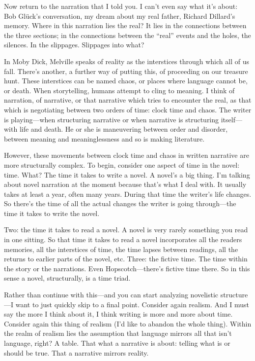 \documentclass[
]{memoir}
\begin{document}
Now return to the narration that I told you. I can't even say what it's
about: Bob Glück's conversation, my dream about my real father, Richard
Dillard's memory. Where in this narration lies the real? It lies in the
connections between the three sections; in the connections between the
``real'' events and the holes, the silences. In the slippages. Slippages
into what?

In Moby Dick, Melville speaks of reality as the interstices through
which all of us fall. There's another, a further way of putting this, of
proceeding on our treasure hunt. These interstices can be named chaos,
or places where language cannot be, or death. When storytelling, humans
attempt to cling to meaning. I think of narration, of narrative, or that
narrative which tries to encounter the real, as that which is
negotiating between two orders of time: clock time and chaos. The writer
is playing---when structuring narrative or when narrative is structuring
itself---with life and death. He or she is maneuvering between order and
disorder, between meaning and meaninglessness and so is making
literature.

However, these movements between clock time and chaos in written
narrative are more structurally complex. To begin, consider one aspect
of time in the novel: time. What? The time it takes to write a novel. A
novel's a big thing. I'm talking about novel narration at the moment
because that's what I deal with. It usually takes at least a year, often
many years. During that time the writer's life changes. So there's the
time of all the actual changes the writer is going through---the time it
takes to write the novel.

Two: the time it takes to read a novel. A novel is very rarely something
you read in one sitting. So that time it takes to read a novel
incorporates all the readers memories, all the interstices of time, the
time lapses between readings, all the returns to earlier parts of the
novel, etc. Three: the fictive time. The time within the story or the
narrations. Even Hopscotch---there's fictive time there. So in this
sense a novel, structurally, is a time triad.

Rather than continue with this---and you can start analyzing novelistic
structure---I want to just quickly skip to a final point. Consider again
realism. And I must say the more I think about it, I think writing is
more and more about time. Consider again this thing of realism (I'd like
to abandon the whole thing). Within the realm of realism lies the
assumption that language mirrors all that isn't language, right? A
table. That what a narrative is about: telling what is or should be
true. That a narrative mirrors reality.
\end{document}
